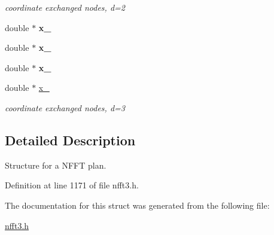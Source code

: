 \begin{CompactItemize}
\begin{CompactList}\small\item\em coordinate exchanged nodes, d=2 \item\end{CompactList}\item 
\hypertarget{structnsfft__plan_o17}{
double $\ast$ {\bf x\_}}
\label{structnsfft__plan_o17}

\item 
\hypertarget{structnsfft__plan_o18}{
double $\ast$ {\bf x\_}}
\label{structnsfft__plan_o18}

\item 
\hypertarget{structnsfft__plan_o19}{
double $\ast$ {\bf x\_}}
\label{structnsfft__plan_o19}

\item 
\hypertarget{structnsfft__plan_o20}{
double $\ast$ \hyperlink{structnsfft__plan_o20}{x\_}}
\label{structnsfft__plan_o20}

\begin{CompactList}\small\item\em coordinate exchanged nodes, d=3 \item\end{CompactList}\end{CompactItemize}


\subsection{Detailed Description}
Structure for a NFFT plan. 



Definition at line 1171 of file nfft3.h.

The documentation for this struct was generated from the following file:\begin{CompactItemize}
\item 
\hyperlink{nfft3_8h}{nfft3.h}\end{CompactItemize}
